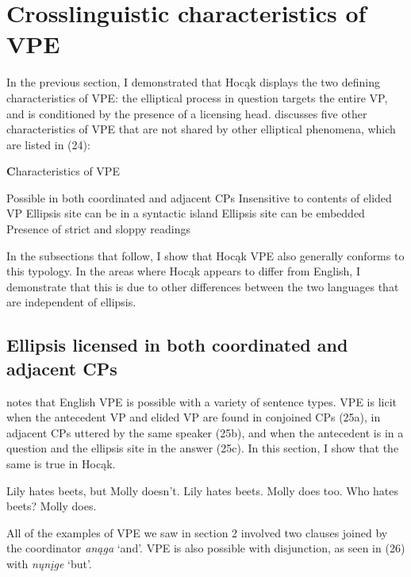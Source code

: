 \documentclass[output=paper]{LSP/langsci}
\begin{document}
\section{Crosslinguistic characteristics of VPE}

In the previous section, I demonstrated that Hocąk displays the two defining characteristics of VPE: the elliptical process in question targets the entire VP, and is conditioned by the presence of a licensing head. \citet{Goldberg2005} discusses five other characteristics of VPE that are not shared by other elliptical phenomena, which are listed in (24): 

\begin{exe}
\ex
{\textbf Characteristics of VPE}
\begin{xlist}
\ex
Possible in both coordinated and adjacent CPs
\ex
Insensitive to contents of elided VP
\ex
Ellipsis site can be in a syntactic island
\ex
Ellipsis site can be embedded
\ex
Presence of strict and sloppy readings
\end{xlist}
\end{exe}


In the subsections that follow, I show that Hocąk VPE also generally conforms to this typology. In the areas where Hocąk appears to differ from English, I demonstrate that this is due to other differences between the two languages that are independent of ellipsis.

\subsection{Ellipsis licensed in both coordinated and adjacent CPs}

\citet{Goldberg2005} notes that English VPE is possible with a variety of sentence types. VPE is licit when the antecedent VP and elided VP are found in conjoined CPs (25a), in adjacent CPs uttered by the same speaker (25b), and when the antecedent is in a question and the ellipsis site in the answer (25c). In this section, I show that the same is true in Hocąk.

\begin{exe}
\ex
\begin{xlist}
\ex
Lily hates beets, but Molly doesn't.
\ex
Lily hates beets. Molly does too.
\ex
Who hates beets? Molly does.
\end{xlist}
\end{exe}

All of the examples of VPE we saw in section 2 involved two clauses joined by the coordinator \emph{anąga} `and'. VPE is also possible with disjunction, as seen in (26) with \emph{nųnįge} `but'.
\end{document}
